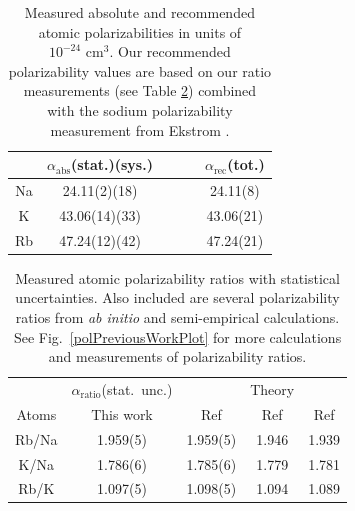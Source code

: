 \begin{table}
\caption[2010 PRA measurements of atomic polarizabilities.]{\label{polResultsTable}Measured absolute and recommended atomic polarizabilities in units of $10^{-24}\textrm{ cm}^3$.  Our recommended polarizability values are based on our ratio measurements (see Table \ref{polRatiosTable}) combined with the sodium polarizability measurement from Ekstrom \etal \cite{Eks95}.}
\begin{center}
\begin{tabular}{c c c c}
\hline\hline
& $\alpha_\textrm{abs}$(stat.)(sys.)  & { $\textrm{  }$ $\textrm{  }$ } & $\alpha_{\textrm{rec}}$(tot.)\\
\hline
Na & 24.11(2)(18) & & 24.11(8)\\
K & 43.06(14)(33) & & 43.06(21)\\
Rb & 47.24(12)(42) &  & 47.24(21)\\
\hline
\end{tabular}
\end{center}
\end{table}



\begin{table}
\caption[2010 PRA measurements of atomic polarizability ratios.]{\label{polRatiosTable}Measured atomic polarizability ratios with statistical uncertainties. Also included are several polarizability ratios from \emph{ab initio} and semi-empirical calculations. See Fig.~\ref{polPreviousWorkPlot} for more calculations and measurements of polarizability ratios.}
\begin{center}
\begin{tabular}{c | c | c c c}
\hline\hline
 &  $\alpha_\textrm{ratio}$(stat.~unc.) & & Theory\\
Atoms & This work & Ref \cite{Der99} & Ref \cite{Saf99} & Ref \cite{Mit03} \\
\hline
Rb/Na & 1.959(5) & 1.959(5) & 1.946 & 1.939 \\
K/Na    & 1.786(6) & 1.785(6) & 1.779 & 1.781 \\
Rb/K    & 1.097(5) & 1.098(5) & 1.094 & 1.089 \\
\hline\hline
\end{tabular}
\end{center}
\end{table}



